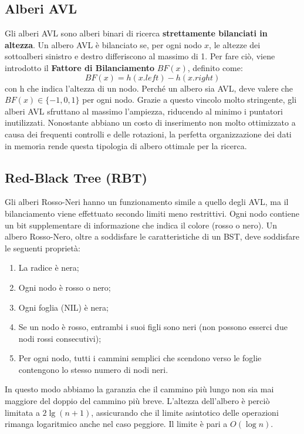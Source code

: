 \documentclass{article}
\begin{document}
\subsection{Alberi AVL}
Gli alberi AVL sono alberi binari di ricerca \textbf{strettamente bilanciati in altezza}. Un albero AVL è bilanciato se, per ogni nodo $x$, le altezze dei sottoalberi sinistro e destro differiscono al massimo di 1. Per fare ciò, viene introdotto il \textbf{Fattore di Bilanciamento} $BF(x)$, definito come:
\begin{equation}
    BF(x) = h(x.left) - h(x.right)
\end{equation}
con h che indica l'altezza di un nodo. Perché un albero sia AVL, deve valere che $BF(x) \in \{-1, 0, 1\}$ per ogni nodo. Grazie a questo vincolo molto stringente, gli alberi AVL sfruttano al massimo l'ampiezza, riducendo al minimo i puntatori inutilizzati. Nonostante abbiano un costo di inserimento non molto ottimizzato a causa dei frequenti controlli e delle rotazioni, la perfetta organizzazione dei dati in memoria rende questa tipologia di albero ottimale per la ricerca.

\subsection{Red-Black Tree (RBT)}
Gli alberi Rosso-Neri hanno un funzionamento simile a quello degli AVL, ma il bilanciamento viene effettuato secondo limiti meno restrittivi. Ogni nodo contiene un bit supplementare di informazione che indica il colore (rosso o nero). Un albero Rosso-Nero, oltre a soddisfare le caratteristiche di un BST, deve soddisfare le seguenti proprietà:
\begin{enumerate}
    \item La radice è nera;
    \item Ogni nodo è rosso o nero;
    \item Ogni foglia (NIL) è nera;
    \item Se un nodo è rosso, entrambi i suoi figli sono neri (non possono esserci due nodi rossi consecutivi);
    \item Per ogni nodo, tutti i cammini semplici che scendono verso le foglie contengono lo stesso numero di nodi neri.
\end{enumerate}
In questo modo abbiamo la garanzia che il cammino più lungo non sia mai maggiore del doppio del cammino più breve. L'altezza dell'albero è perciò limitata a $2\lg(n+1)$, assicurando che il limite asintotico delle operazioni rimanga logaritmico anche nel caso peggiore. Il limite è pari a $O(\log n)$.
\end{document}
